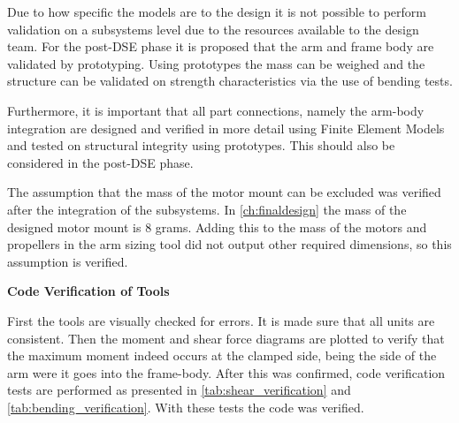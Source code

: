 Due to how specific the models are to the design it is not possible to perform validation on a subsystems level due to the resources available to the design team. For the post-DSE phase it is proposed that the arm and frame body are validated by prototyping. Using prototypes the mass can be weighed and the structure can be validated on strength characteristics via the use of bending tests.

Furthermore, it is important that all part connections, namely the arm-body integration are designed and verified in more detail using Finite Element Models and tested on structural integrity using prototypes. This should also be considered in the post-DSE phase.

The assumption that the mass of the motor mount can be excluded was verified after the integration of the subsystems. In \autoref{ch:finaldesign} the mass of the designed motor mount is 8 grams. Adding this to the mass of the motors and propellers in the arm sizing tool did not output other required dimensions, so this assumption is verified. 


\textbf{Code Verification of Tools}\newline

First the tools are visually checked for errors. It is made sure that all units are consistent. Then the moment and shear force diagrams are plotted to verify that the maximum moment indeed occurs at the clamped side, being the side of the arm were it goes into the frame-body. After this was confirmed, code verification tests are performed as presented in \autoref{tab:shear_verification} and \autoref{tab:bending_verification}. With these tests the code was verified.

